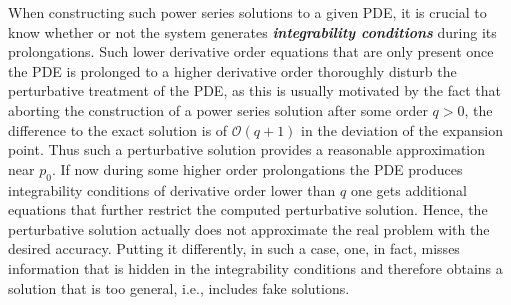 \documentclass[%
preprint,
titlepage,
nofootinbib,
amsmath,amssymb,
showkeys,
aps,
prd,
floatfix,
]{revtex4-2}
\begin{document}
When constructing such power series solutions to a given PDE, it is crucial to know whether or not the system generates \textit{\textbf{integrability conditions}} during its prolongations. Such lower derivative order equations that are only present once the PDE is prolonged to a higher derivative order thoroughly disturb the perturbative treatment of the PDE, as this is usually motivated by the fact that aborting the construction of a power series solution
after some order $q>0$, the difference to the exact solution is of $\mathcal{O}(q+1)$ in the deviation of the expansion point. Thus such a perturbative solution provides a reasonable approximation near $p_0$. 
If now during some higher order prolongations the PDE produces integrability conditions of derivative order lower than $q$ one gets additional equations that further restrict the computed perturbative solution. 
Hence, the perturbative solution actually does not approximate the real problem with the desired accuracy. Putting it differently, in such a case, one, in fact, misses information that is hidden in the integrability conditions and therefore obtains a solution that is too general, i.e., includes fake solutions. 
\end{document}
